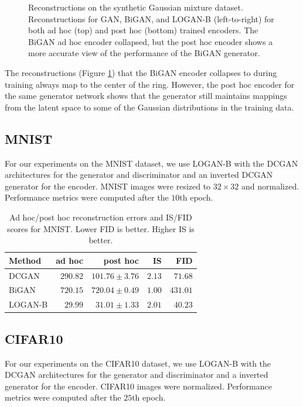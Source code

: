 \documentclass[10pt,twocolumn,letterpaper]{article}
\begin{document}
\begin{figure}
\begin{center}
\caption{Reconstructions on the synthetic Gaussian mixture dataset. Reconstructions for GAN, BiGAN, and LOGAN-B (left-to-right) for both ad hoc (top) and post hoc (bottom) trained encoders. The BiGAN ad hoc encoder collapsed, but the post hoc encoder shows a more accurate view of the performance of the BiGAN generator.}
\end{center}
\label{fig:recon_synthetic_fig}
\end{figure}

The reconstructions (Figure \ref{fig:recon_synthetic_fig}) that the BiGAN encoder collapses to during training always map to the center of the ring. However, the post hoc encoder for the same generator network shows that the generator still maintains mappings from the latent space to some of the Gaussian distributions in the training data.

\subsection{MNIST}

For our experiments on the MNIST \cite{lecun1998gradient} dataset, we use LOGAN-B with the DCGAN \cite{radford2015unsupervised} architectures for the generator and discriminator and an inverted DCGAN generator for the encoder. MNIST images were resized to $32\times 32$ and normalized. Performance metrics were computed after the $10$th epoch. 

\begin{table}[!ht]
    \centering
    \begin{tabular}{lrrrr}
        Method & ad hoc & post hoc & IS & FID\\\hline
        DCGAN   & $290.82$ & $101.76 \pm 3.76$ & $2.13$ & $71.68$ \\
        BiGAN   & $720.15$ & $720.04 \pm 0.49$ & $1.00$ & $431.01$ \\
        LOGAN-B & $29.99$  &  $31.01 \pm 1.33$ & $2.01$ & $40.23$ \\
    \end{tabular}
    \caption{Ad hoc/post hoc reconstruction errors and IS/FID scores for MNIST. Lower FID is better. Higher IS is better.}
    \label{tab:mnist_err}
\end{table}


\subsection{CIFAR10}

For our experiments on the CIFAR10 \cite{krizhevsky2009learning} dataset, we use LOGAN-B with the DCGAN \cite{radford2015unsupervised} architectures for the generator and discriminator and a inverted generator for the encoder. CIFAR10 images were normalized. Performance metrics were computed after the $25$th epoch.
\end{document}
